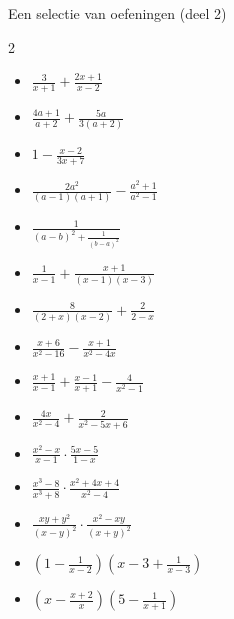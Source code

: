 \begin{lesactiviteit}{Een selectie van oefeningen (deel 2)}
\begin{multicols}{2}
\begin{vraagenantwoord}[start=5]
   \begin{itemize}[label=\textcolor{\rubriekkleur}{\Large\textbullet}]
    \item $\frac{3}{x+1} + \frac{2x+1}{x-2}$ 
    \item $\frac{4a+1}{a+2} + \frac{5a}{3(a+2)}$
    \item $1-\frac{x-2}{3x+7}$
    \end{itemize}
    \begin{itemize}[label=\textcolor{\rubriekkleur}{\Large\textbullet}] 
    \item $\frac{2a^2}{(a-1)(a+1)}- \frac{a^2+1}{a^2-1}$
    \item $\frac{1}{(a-b)^2+ \frac{1}{(b-a)^2}}$
    \item $\frac{1}{x-1} + \frac{x+1}{(x-1)(x-3)}$
    \item $\frac{8}{(2+x)(x-2)} + \frac{2}{2-x}$
    \end{itemize}
    \begin{itemize}[label=\textcolor{\rubriekkleur}{\Large\textbullet}] 
    \item $\frac{x+6}{x^2-16} - \frac{x+1}{x^2-4x}$
    \item $\frac{x+1}{x-1} + \frac{x-1}{x+1} - \frac{4}{x^2-1}$
    \item $\frac{4x}{x^2-4} + \frac{2}{x^2-5x+6}$
    \end{itemize}
    \begin{itemize}[label=\textcolor{\rubriekkleur}{\Large\textbullet}] 
    \item $\frac{x^2-x}{x-1} \cdot \frac{5x-5}{1-x}$
    \item $\frac{x^3-8}{x^3+8} \cdot \frac{x^2+4x+4}{x^2-4}$
    \item $\frac{xy+y^2}{(x-y)^2} \cdot \frac{x^2-xy}{(x+y)^2}$
    \end{itemize}
    \begin{itemize}[label=\textcolor{\rubriekkleur}{\Large\textbullet}] 
    \item $(1-\frac{1}{x-2})(x-3+\frac{1}{x-3})$
    \item $(x-\frac{x+2}{x})(5-\frac{1}{x+1})$

\end{itemize}
\end{vraagenantwoord}
\end{multicols}
\end{lesactiviteit}
